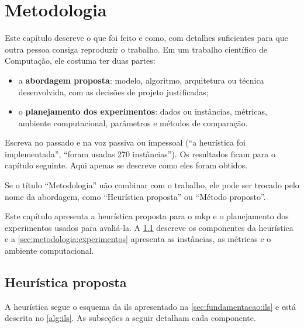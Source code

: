\chapter{Metodologia}
\label{cap:metodologia}

\begin{instrucao}
Este capítulo descreve o que foi feito e como, com detalhes suficientes para
que outra pessoa consiga reproduzir o trabalho. Em um trabalho científico de
Computação, ele costuma ter duas partes:
\begin{itemize}
  \item a \textbf{abordagem proposta}: modelo, algoritmo, arquitetura ou
        técnica desenvolvida, com as decisões de projeto justificadas;
  \item o \textbf{planejamento dos experimentos}: dados ou instâncias,
        métricas, ambiente computacional, parâmetros e métodos de comparação.
\end{itemize}
Escreva no passado e na voz passiva ou impessoal (``a heurística foi
implementada'', ``foram usadas 270 instâncias''). Os resultados ficam para o
capítulo seguinte. Aqui apenas se descreve como eles foram obtidos.

Se o título ``Metodologia'' não combinar com o trabalho, ele pode ser trocado
pelo nome da abordagem, como ``Heurística proposta'' ou ``Método proposto''.
\end{instrucao}

Este capítulo apresenta a heurística proposta para o \acs{mkp} e o
planejamento dos experimentos usados para avaliá-la. A
\cref{sec:metodologia:heuristica} descreve os componentes da heurística e a
\cref{sec:metodologia:experimentos} apresenta as instâncias, as métricas e o
ambiente computacional.

\section{Heurística proposta}
\label{sec:metodologia:heuristica}

A heurística segue o esquema da \acs{ils} apresentado na
\cref{sec:fundamentacao:ils} e está descrita no \cref{alg:ils}. As subseções a
seguir detalham cada componente.

